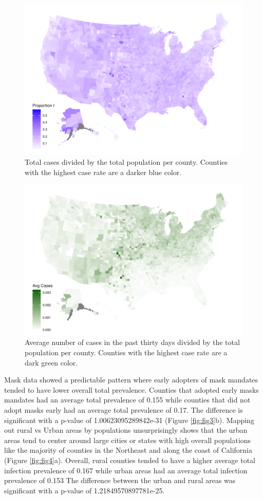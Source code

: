 \documentclass[
  12pt,
]{article}
\begin{document}
\begin{figure}[H]

{\centering \includegraphics[width=0.7\linewidth,]{Final-Manuscript_files/figure-latex/fig1-1} 

}

\caption{Total cases divided by the total population per county. Counties with the highest case rate are a darker blue color.}\label{fig:fig1}
\end{figure}



\begin{figure}[H]

{\centering \includegraphics[width=0.7\linewidth,]{Final-Manuscript_files/figure-latex/fig2-1} 

}

\caption{Average number of cases in the past thirty days divided by the total population per county. Counties with the highest case rate are a dark green color.}\label{fig:fig2}
\end{figure}

Mask data showed a predictable pattern where early adopters of mask mandates tended to have lower overall total prevalence. Counties that adopted early masks mandates had an average total prevalence of 0.155 while counties that did not adopt masks early had an average total prevalence of 0.17. The difference is significant with a p-value of 1.00623095289842e-31 (Figure \ref{fig:fig3}b). Mapping out rural vs Urban areas by populations unsurprisingly shows that the urban areas tend to center around large cities or states with high overall populations like the majority of counties in the Northeast and along the coast of California (Figure \ref{fig:fig4}a). Overall, rural counties tended to have a higher average total infection prevalence of 0.167 while urban areas had an average total infection prevalence of 0.153 The difference between the urban and rural areas was significant with a p-value of 1.21849570897781e-25.
\end{document}
